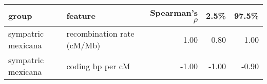 \begin{table}[ht]
\centering
\begin{tabular}{llrrr}
  \hline
group & feature & Spearman's $\rho$ & 2.5\% & 97.5\% \\ 
  \hline
sympatric mexicana & recombination rate (cM/Mb) & 1.00 & 0.80 & 1.00 \\ 
  sympatric mexicana & coding bp per cM & -1.00 & -1.00 & -0.90 \\ 
   \hline
\end{tabular}
\end{table}
